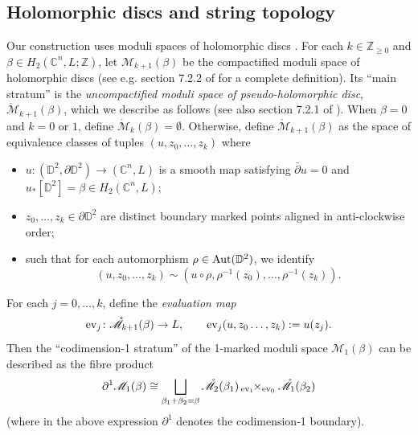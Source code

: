 \documentclass[10pt]{amsart}
\numberwithin{equation}{section}
\theoremstyle{plain}
\theoremstyle{definition}
\theoremstyle{remark}
\numberwithin{equation}{section}
\newcommand{\Z}{\mathbb{Z}}
\newcommand{\C}{\mathbb{C}}
\newcommand{\D}{\mathbb{D}}
\newcommand{\ev}{\textup{ev}}
\newcommand{\ms}[1]{\mathscr{#1}}
\newcommand{\fiberprod}[2]{\,_{#1}\!\!\times_{#2} }
\newcommand{\Aut}{\textup{Aut}}
\begin{document}
{\subsection{Holomorphic discs and string topology}
Our construction uses moduli spaces of holomorphic discs \cite{GromovPseudo}.
For each $k\in \Z_{\geq 0}$ and $\beta\in H_2(\C^n, L;\Z)$, let $\ms{M}_{k+1}(\beta)$ be the compactified moduli space of holomorphic discs (see e.g. section 7.2.2 of \cite{Irie2} for a complete definition). 
Its ``main stratum'' is the \emph{uncompactified moduli space of pseudo-holomorphic disc}, $\mathring{\ms{M}}_{k+1}(\beta)$, which we describe as follows (see also section 7.2.1 of \cite{Irie2}). When $\beta = 0$ and $k=0$ or $1$, define $\mathring{\ms{M}}_k(\beta)=\emptyset$. 
Otherwise, define $\mathring{\ms{M}}_{k+1}(\beta)$ as the space of equivalence classes of  tuples $(u, z_0,\dots, z_k)$ where 
\begin{itemize}
	\item $u\colon (\D^2, \partial \D^2)\to (\C^n,L)$ is a smooth map satisfying $\bar\partial u = 0$ and $u_*[\D^2] = \beta\in H_2(\C^n,L)$;
	\item $z_0,\dots, z_k\in \partial \D^2$ are distinct boundary marked points aligned in anti-clockwise order;
	\item such that for each automorphism $\rho \in \Aut(\D^2)$, we identify \[(u,z_0,\dots, z_k)\sim (u\circ \rho, \rho^{-1}(z_0),\dots, \rho^{-1}(z_k)).\]
\end{itemize}
For each $j=0,\dots, k$, define the \emph{evaluation map}
\[
	\ev_j\colon \mathring{\ms{M}}_{k+1}(\beta)\to L,\quad \quad \ev_j(u, z_0\dots, z_k):= u(z_j). 
\]
Then the ``codimension-1 stratum'' of the 1-marked moduli space  $\ms{M}_{1}(\beta)$ can be described as the fibre product \begin{align}\label{Eq: Codim1Boundary} \partial^1 \ms{M}_1(\beta)\cong  \bigsqcup_{\beta_1+\beta_2=\beta} \mathring{\ms{M}}_2(\beta_1) \fiberprod{\ev_1}{\ev_0} \mathring{\ms{M}}_1(\beta_2) \end{align}
(where in the above expression $\partial^1$  denotes the codimension-1 boundary).

}
\end{document}
